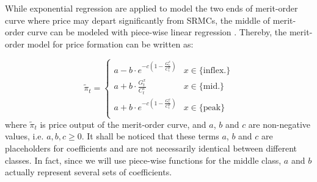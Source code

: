 While exponential regression are applied to model the two ends of merit-order curve where price may depart significantly from SRMCs, the middle of merit-order curve can be modeled with piece-wise linear regression \cite{Grunewald2012a}. Thereby, the merit-order model for price formation can be written as:

\begin{equation}
\label{eq:merit-order-model}
\tilde{\pi}_t = \begin{cases}
a - b \cdot e^{-c\left(1-\frac{G^{x}_t }{C^{x}_t}\right)} & x \in \{\text{inflex.}\}\\
a + b \cdot \frac{G^{x}_t }{C^{x}_t} & x \in \{\text{mid.}\} \\ 
a + b \cdot e^{-c\left(1-\frac{G^{x}_t }{C^{x}_t}\right)} &  x \in \{\text{peak}\}  \\ 
\end{cases}
\end{equation}
where $\tilde{\pi}_t$ is price output of the merit-order curve, and $a$, $b$ and $c$ are non-negative values, i.e. $a,b,c \geq 0$. It shall be noticed that these terms $a$, $b$ and $c$  are placeholders for coefficients and are not necessarily identical between different classes. In fact, since we will use piece-wise functions for the middle class, $a$ and $b$ actually represent several sets of coefficients.



